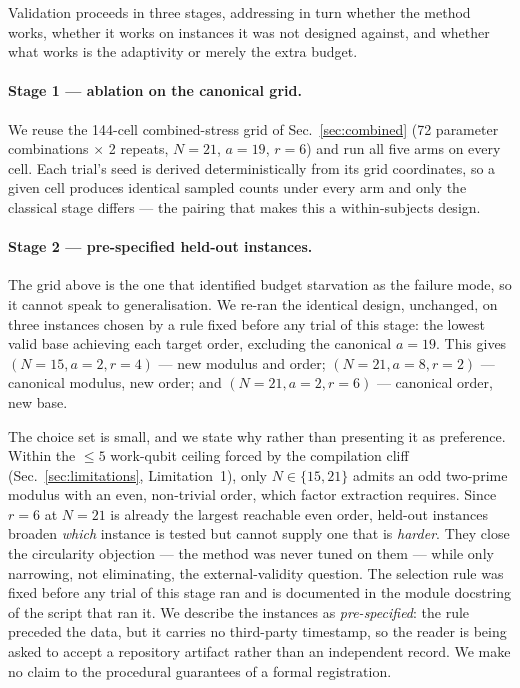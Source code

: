 \documentclass[preprint,11pt]{elsarticle}
\begin{document}
Validation proceeds in three stages, addressing in turn whether the
method works, whether it works on instances it was not designed against,
and whether what works is the adaptivity or merely the extra budget.

\paragraph{Stage 1 --- ablation on the canonical grid.} We reuse the
144-cell combined-stress grid of Sec.~\ref{sec:combined} (72 parameter
combinations $\times$ 2 repeats, $N=21$, $a=19$, $r=6$) and run all five
arms on every cell. Each trial's seed is derived deterministically from
its grid coordinates, so a given cell produces identical sampled counts
under every arm and only the classical stage differs --- the pairing that
makes this a within-subjects design.

\paragraph{Stage 2 --- pre-specified held-out instances.} The grid above
is the one that identified budget starvation as the failure mode, so it
cannot speak to generalisation. We re-ran the identical design, unchanged,
on three instances chosen by a rule fixed before any trial of this stage:
the lowest valid base achieving each target order, excluding the
canonical $a=19$. This gives $(N{=}15,a{=}2,r{=}4)$ --- new modulus and
order; $(N{=}21,a{=}8,r{=}2)$ --- canonical modulus, new order; and
$(N{=}21,a{=}2,r{=}6)$ --- canonical order, new base.

The choice set is small, and we state why rather than presenting it as
preference. Within the ${\le}5$ work-qubit ceiling forced by the
compilation cliff (Sec.~\ref{sec:limitations}, Limitation~1), only
$N\in\{15,21\}$ admits an odd two-prime modulus with an even, non-trivial
order, which factor extraction requires. Since $r=6$ at $N=21$ is already
the largest reachable even order, held-out instances broaden \emph{which}
instance is tested but cannot supply one that is \emph{harder}. They
close the circularity objection --- the method was never tuned on them ---
while only narrowing, not eliminating, the external-validity question.
The selection rule was fixed before any trial of this stage ran and is
documented in the module docstring of the script that ran it. We describe
the instances as \emph{pre-specified}: the rule preceded the data, but
it carries no third-party timestamp, so the reader is being asked to
accept a repository artifact rather than an independent record. We make
no claim to the procedural guarantees of a formal registration.
\end{document}
